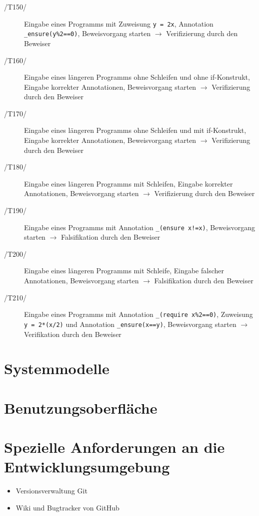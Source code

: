 \documentclass[a4paper,10pt]{article}
\begin{document}
\begin{description}
\item[/T150/] Eingabe eines Programms mit Zuweisung \texttt{y = 2x}, Annotation \texttt{\_ensure(y\%2==0)}, Beweisvorgang starten $\to$ Verifizierung durch den Beweiser
\item[/T160/] Eingabe eines längeren Programms ohne Schleifen und ohne if-Konstrukt, Eingabe korrekter Annotationen, Beweisvorgang starten $\to$ Verifizierung durch den Beweiser
\item[/T170/] Eingabe eines längeren Programms ohne Schleifen und mit if-Konstrukt, Eingabe korrekter Annotationen, Beweisvorgang starten $\to$ Verifizierung durch den Beweiser
\item[/T180/] Eingabe eines längeren Programms mit Schleifen, Eingabe korrekter Annotationen, Beweisvorgang starten $\to$ Verifizierung durch den Beweiser
\item[/T190/] Eingabe eines Programms mit Annotation \texttt{\_(ensure x!=x)}, Beweisvorgang starten $\to$ Falsifikation durch den Beweiser
\item[/T200/] Eingabe eines längeren Programms mit Schleife, Eingabe falscher Annotationen, Beweisvorgang starten $\to$ Falsifikation durch den Beweiser
\item[/T210/] Eingabe eines Programms mit Annotation \texttt{\_(require x\%2==0)}, Zuweisung \texttt{y = 2*(x/2)} und Annotation \texttt{\_ensure(x==y)}, Beweisvorgang starten $\to$ Verifikation durch den Beweiser
\end{description}

\section{Systemmodelle}


\section{Benutzungsoberfläche}

\section{Spezielle Anforderungen an die Entwicklungsumgebung}
\begin{itemize}
  \item Versionsverwaltung Git
  \item Wiki und Bugtracker von GitHub
\end{itemize}
\end{document}
